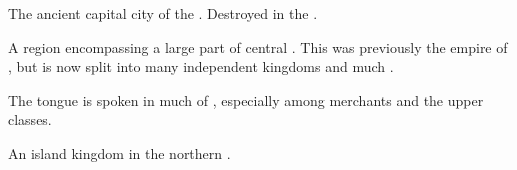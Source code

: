 \begin{gloss}
\begin{subgloss}
  \begin{comment}
  \subparagraph{\ShiinMerodar}
  \end{comment}
  \gitem{\ShiinMerodar}
  The ancient capital city of the \VaimonCaliphate.
  Destroyed in the . 
\end{subgloss}









\begin{comment}
\paragraph{\Velcad}
\end{comment}
\gitem{\Velcad}
A region encompassing a large part of central \Azmith. 
This was previously the empire of , but is now split into many independent kingdoms and much \Wylde{}. 

The \Velcadian{} tongue is spoken in much of \Velcad{}, especially among merchants and the upper classes. 









\begin{comment}
\paragraph{\Vidra}
\end{comment}
\gitem{\Vidra}
An island kingdom in the northern . 









\end{gloss}



















